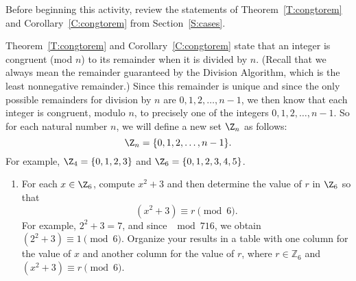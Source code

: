 \begin{previewactivity}\label{PA:function-congruence} \hfill

Before beginning this activity, review the statements of  Theorem~\ref{T:congtorem}  and  Corollary~\ref{C:congtorem}   from Section~\ref{S:cases}.

Theorem~\ref{T:congtorem} and Corollary~\ref{C:congtorem} state that an integer is congruent (mod $n$) to its remainder when it is divided by  $n$.  (Recall that we always mean the remainder guaranteed by the Division Algorithm, which is the least nonnegative remainder.)  Since this remainder is unique and since the only possible remainders for division by $n$  are  $0, 1, 2,  \ldots , n - 1$, we then know that each integer is congruent, modulo $n$, to precisely one of the integers $0,1,2, \ldots ,n - 1$.  So for each natural number 
$n$, we will define a new set $\Z_n$ as follows:
\[
\Z_n = \{ 0, 1, 2, \ldots , n - 1 \}.
\]
For example, $\Z_4 = \{0, 1, 2, 3 \}$ and $\Z_6 = \{ 0, 1, 2, 3, 4, 5 \}$.
\begin{enumerate}
\item For each  $x \in \Z_6 $, compute  $x^2  + 3$ and then determine the value of  $r$  in  
$\Z_6 $ so that
\[
\left( {x^2  + 3} \right) \equiv r\pmod 6.
\]
For example,  $2^2  + 3 = 7$, and since $\mod {7}{1}{6}$, we obtain   
$\left( {2^2  + 3} \right) \equiv 1 \pmod 6$.  Organize your results in a table with one column for the value of $x$ and another column for the value of $r$, where $r \in \mathbb{Z}_6$ and $\left( {x^2  + 3} \right) \equiv r\pmod 6$. 
\label{PA:functioncongruence1}


\end{enumerate}
\end{previewactivity}
